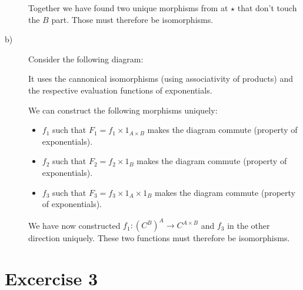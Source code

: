 \documentclass{scrartcl}
\begin{document}
\begin{description}
        Together we have found two unique morphisms from at $\star$ that don't touch the $B$ part. Those must therefore be isomorphisms.
        
        \item[b)] Consider the following diagram:\begin{figure}[H]
        \centering
    \end{figure}
        It uses the cannonical isomorphisms (using associativity of products) and the respective evaluation functions of exponentials.
        
        We can construct the following morphisms uniquely:
        
        \begin{itemize}
            \item $f_1$ such that $F_1 = f_1 × 1_{A × B}$ makes the diagram commute (property of exponentials).
            \item $f_2$ such that $F_2 = f_2 × 1_B$ makes the diagram commute (property of exponentials).
            \item $f_3$ such that $F_3 = f_3 × 1_A × 1_B$ makes the diagram commute (property of exponentials).
        \end{itemize}
        
        We have now constructed $f_1 : (C^B)^A → C^{A × B}$ and $f_3$ in the other direction uniquely. These two functions must therefore be isomorphisms.
    \end{description}
    
    \section*{Excercise 3}
    
\end{document}
